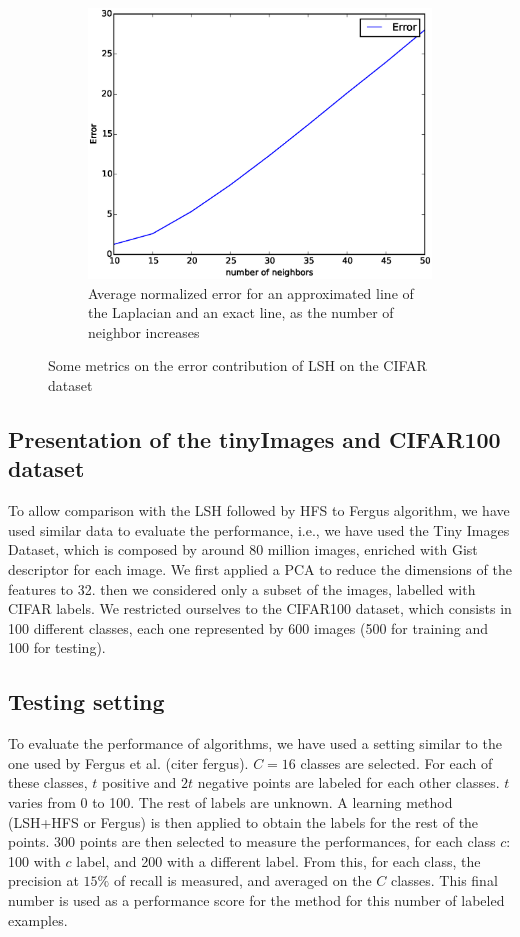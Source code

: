 \documentclass{article} %
\begin{document}
\begin{figure}[!ht]
 \centering
 \begin{subfigure}{0.43\textwidth}
   \includegraphics[width=\textwidth]{figures/error_k.eps}
   \caption{Average normalized error for an approximated line of the Laplacian and an exact line, as the number of neighbor increases}
 \end{subfigure}\hfill
 \caption{Some metrics on the error contribution of LSH on the CIFAR dataset}
 \label{figure_test_theoriques}
\end{figure}


\subsection{Presentation of the tinyImages and CIFAR100 dataset}
To allow comparison with the LSH followed by HFS to Fergus algorithm, we have used similar data to evaluate the performance, i.e., we have used the Tiny Images Dataset, which is composed by around 80 million images, enriched with Gist descriptor for each image. We first applied a PCA to reduce the dimensions of the features to 32. then we considered only a subset of the images, labelled with CIFAR labels. We restricted ourselves to the CIFAR100 dataset, which consists in 100 different classes, each one represented by 600 images (500 for training and 100 for testing).
 
\subsection{Testing setting}
To evaluate the performance of algorithms, we have used a setting similar to the one used by Fergus et al. (citer fergus). $C=16$ classes are selected. For each of these classes, $t$ positive and $2t$ negative points are labeled for each other classes. $t$ varies from 0 to 100. The rest of labels are unknown. A learning method (LSH+HFS or Fergus) is then applied to obtain the labels for the rest of the points. $300$ points are then selected to measure the performances, for each class $c$: 100 with $c$ label, and 200 with a different label. From this, for each class, the precision at $15\%$ of recall is measured, and averaged on the $C$ classes. This final number is used as a performance score for the method for this number of labeled examples.
\end{document}
